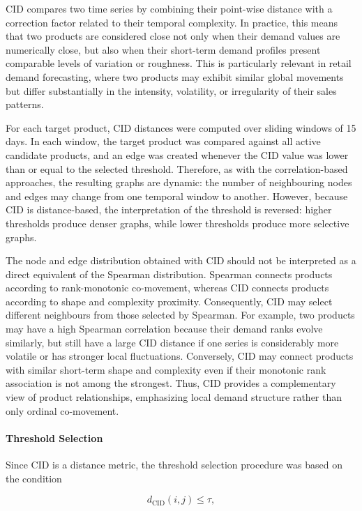 CID compares two time series by combining their point-wise distance with a correction factor related to their temporal complexity. In practice, this means that two products are considered close not only when their demand values are numerically close, but also when their short-term demand profiles present comparable levels of variation or roughness. This is particularly relevant in retail demand forecasting, where two products may exhibit similar global movements but differ substantially in the intensity, volatility, or irregularity of their sales patterns.

For each target product, CID distances were computed over sliding windows of 15 days. In each window, the target product was compared against all active candidate products, and an edge was created whenever the CID value was lower than or equal to the selected threshold. Therefore, as with the correlation-based approaches, the resulting graphs are dynamic: the number of neighbouring nodes and edges may change from one temporal window to another. However, because CID is distance-based, the interpretation of the threshold is reversed: higher thresholds produce denser graphs, while lower thresholds produce more selective graphs.

The node and edge distribution obtained with CID should not be interpreted as a direct equivalent of the Spearman distribution. Spearman connects products according to rank-monotonic co-movement, whereas CID connects products according to shape and complexity proximity. Consequently, CID may select different neighbours from those selected by Spearman. For example, two products may have a high Spearman correlation because their demand ranks evolve similarly, but still have a large CID distance if one series is considerably more volatile or has stronger local fluctuations. Conversely, CID may connect products with similar short-term shape and complexity even if their monotonic rank association is not among the strongest. Thus, CID provides a complementary view of product relationships, emphasizing local demand structure rather than only ordinal co-movement.

\paragraph{Threshold Selection}

Since CID is a distance metric, the threshold selection procedure was based on the condition

\[
d_{\text{CID}}(i,j) \leq \tau,
\]

